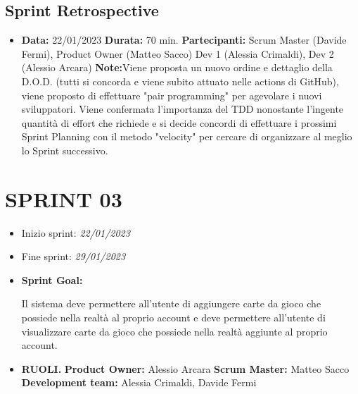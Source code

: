 \documentclass{article}
\begin{document}
    \subsection{Sprint Retrospective}
    \begin{itemize}
        \item \textbf{Data:} 22/01/2023
        \newline \textbf{Durata:} 70 min.
        \newline \textbf{Partecipanti:} Scrum Master (Davide Fermi), Product Owner (Matteo Sacco) Dev 1 (Alessia Crimaldi), Dev 2 (Alessio Arcara)
        \newline \textbf{Note:}Viene proposta un nuovo ordine e dettaglio della D.O.D. (tutti si concorda e viene subito attuato nelle actions di GitHub), viene proposto di effettuare "pair programming" per agevolare i nuovi sviluppatori. Viene confermata l'importanza del TDD nonostante l'ingente quantità di effort che richiede e si decide concordi di effettuare i prossimi Sprint Planning con il metodo "velocity" per cercare di organizzare al meglio lo Sprint successivo.
    \end{itemize}


    \newpage

    \section{SPRINT 03}

    \begin{itemize}
        \item Inizio sprint: \textit{22/01/2023}
        \item Fine sprint: \textit{29/01/2023}
    \end{itemize}

    \begin{itemize}
        \item \textbf{Sprint Goal:}
        \begin{indent}
            \newline Il sistema deve permettere all’utente di aggiungere carte da gioco che possiede nella realtà al proprio account e deve permettere all’utente di visualizzare carte da gioco che possiede nella realtà aggiunte al proprio account.
        \end{indent}
    \end{itemize}

    \begin{itemize}
        \item \textbf{RUOLI.}
        \newline \textbf{Product Owner:} Alessio Arcara
        \newline \textbf{Scrum Master:} Matteo Sacco
        \newline \textbf{Development team:} Alessia Crimaldi, Davide Fermi
    \end{itemize}
\end{document}
